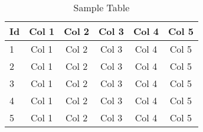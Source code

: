 \begin{longtable}{l|ccccc}
  \caption{Sample Table}
  \label{table:table-1}
  \\
  \hline
  \hline
  Id & Col 1 & Col 2 & Col 3 & Col 4 & Col 5\\
  \hline
  1 & Col 1 & Col 2 & Col 3 & Col 4 & Col 5\\
  2 & Col 1 & Col 2 & Col 3 & Col 4 & Col 5\\
  3 & Col 1 & Col 2 & Col 3 & Col 4 & Col 5\\
  4 & Col 1 & Col 2 & Col 3 & Col 4 & Col 5\\
  5 & Col 1 & Col 2 & Col 3 & Col 4 & Col 5\\
  \hline
  \hline
\end{longtable}